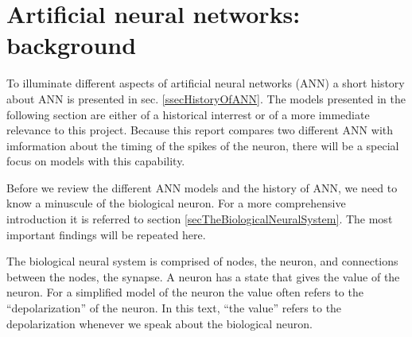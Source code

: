 % 			
% 			
% 			
% 			
% 			
%
%
%
%
\section{Artificial neural networks: background}

To illuminate different aspects of artificial neural networks (ANN) a short history about ANN is presented in sec. \ref{ssecHistoryOfANN}. 
The models presented in the following section are either of a historical interrest or of a more immediate relevance to this project.
Because this report compares two different ANN with imformation about the timing of the spikes of the neuron, there will be a special focus on models with this capability. %
%



Before we review the different ANN models and the history of ANN, we need to know a minuscule of the biological neuron. For a more comprehensive introduction it is referred to section \ref{secTheBiologicalNeuralSystem}.
The most important findings will be repeated here.

The biological neural system is comprised of nodes, the neuron, and connections between the nodes, the synapse.
A neuron has a state that gives the value of the neuron. 
For a simplified model of the neuron the value often refers to the ``depolarization'' of the neuron. %
In this text, ``the value'' refers to the depolarization whenever we speak about the biological neuron.

